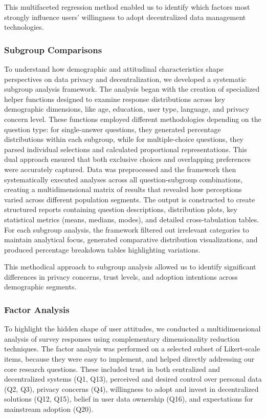 	This multifaceted regression method enabled us to identify which factors most strongly influence users' willingness to adopt decentralized data management technologies.
	\subsubsection{Subgroup Comparisons}
    To understand how demographic and attitudinal characteristics shape perspectives on data privacy and decentralization, we developed a systematic subgroup analysis framework. The analysis began with the creation of specialized helper functions designed to examine response distributions across key demographic dimensions, like age, education, user type, language, and privacy concern level. These functions employed different methodologies depending on the question type: for single-answer questions, they generated percentage distributions within each subgroup, while for multiple-choice questions, they parsed individual selections and calculated proportional representations. This dual approach ensured that both exclusive choices and overlapping preferences were accurately captured. Data was preprocessed and the framework then systematically executed analyses across all question-subgroup combinations, creating a multidimensional matrix of results that revealed how perceptions varied across different population segments.
    The output is constructed to create structured reports containing question descriptions, distribution plots, key statistical metrics (means, medians, modes), and detailed cross-tabulation tables. For each subgroup analysis, the framework filtered out irrelevant categories to maintain analytical focus, generated comparative distribution visualizations, and produced percentage breakdown tables highlighting variations. 
	
	This methodical approach to subgroup analysis allowed us to identify significant differences in privacy concerns, trust levels, and adoption intentions across demographic segments.
	\subsubsection{Factor Analysis}
	To highlight the hidden shape of user attitudes, we conducted a multidimensional analysis of survey responses using complementary dimensionality reduction techniques. The factor analysis was performed on a selected subset of Likert-scale items, because they were easy to implement, and helped directly addressing our core research questions. These included trust in both centralized and decentralized systems (Q1, Q13), perceived and desired control over personal data (Q2, Q3), privacy concerns (Q4), willingness to adopt and invest in decentralized solutions (Q12, Q15), belief in user data ownership (Q16), and expectations for mainstream adoption (Q20). 
	
